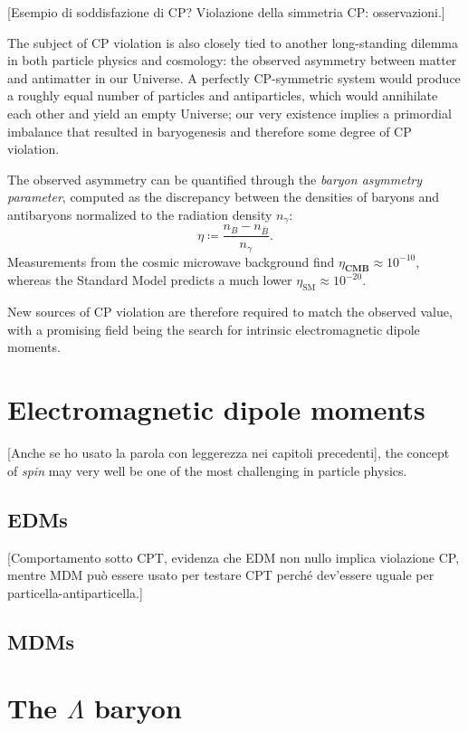 [Esempio di soddisfazione di CP? Violazione della simmetria CP: osservazioni.]

The subject of CP violation is also closely tied to another long-standing dilemma in both particle physics and cosmology: the observed asymmetry between matter and antimatter in our Universe.
A perfectly CP-symmetric system would produce a roughly equal number of particles and antiparticles, which would annihilate each other and yield an empty Universe; our very existence implies a primordial imbalance that resulted in baryogenesis and therefore some degree of CP violation.

The observed asymmetry can be quantified through the \textit{baryon asymmetry parameter}, computed as the discrepancy between the densities of baryons and antibaryons normalized to the radiation density $n_\gamma$:
\begin{equation}
\eta \coloneqq \frac{n_B - n_{\bar{B}}}{n_\gamma}.
\end{equation}
Measurements from the cosmic microwave background
find $\eta_\textbf{CMB} \approx {10}^{-10}$, whereas the Standard Model predicts a much lower $\eta_\text{SM} \approx {10}^{-20}$.

New sources of CP violation are therefore required to match the observed value, with a promising field being the search for intrinsic electromagnetic dipole moments.

\section{Electromagnetic dipole moments}

[Anche se ho usato la parola con leggerezza nei capitoli precedenti], the concept of \textit{spin} may very well be one of the most challenging in particle physics.

\subsection{EDMs}

[Comportamento sotto CPT, evidenza che EDM non nullo implica violazione CP, mentre MDM può essere usato per testare CPT perché dev'essere uguale per particella-antiparticella.]

\subsection{MDMs}

\section{The \texorpdfstring{$\Lambda$}{Lambda} baryon}

